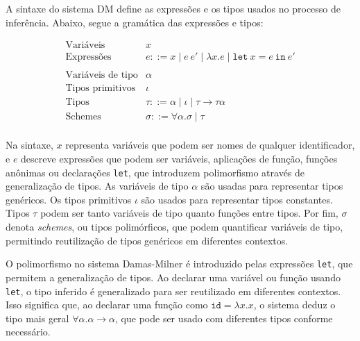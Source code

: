 A sintaxe do sistema DM define as expressões e os tipos usados no processo de inferência.
Abaixo, segue a gramática das expressões e tipos:

\begin{equation}\label{eq:dm-syntax}
  \begin{array}{ll}
    \text{Variáveis}         & x                                                                                 \\
    \text{Expressões}        & e ::= x \mid e \ e' \mid \lambda x.e \mid \texttt{let} \ x = e \ \texttt{in} \ e' \\
    \\
    \text{Variáveis de tipo} & \alpha                                                                            \\
    \text{Tipos primitivos}  & \iota                                                                             \\
    \text{Tipos}             & \tau ::= \alpha \mid \iota \mid \tau \rightarrow \tau
    \alpha                                                                                                       \\
    \text{Schemes}           & \sigma ::= \forall \alpha. \sigma \mid \tau                                       \\
  \end{array}
\end{equation}

Na sintaxe, $x$ representa variáveis que podem ser nomes de qualquer identificador, e $e$ descreve expressões que podem ser variáveis, aplicações de função, funções anônimas ou declarações \texttt{let}, que introduzem polimorfismo através de generalização de tipos.
As variáveis de tipo $\alpha$ são usadas para representar tipos genéricos.
Os tipos primitivos $\iota$ são usados para representar tipos constantes.
Tipos $\tau$ podem ser tanto variáveis de tipo quanto funções entre tipos.
Por fim, $\sigma$ denota \textit{schemes}, ou tipos polimórficos, que podem quantificar variáveis de tipo, permitindo reutilização de tipos genéricos em diferentes contextos.

O polimorfismo no sistema Damas-Milner é introduzido pelas expressões \texttt{let}, que permitem a generalização de tipos. Ao declarar uma variável ou função usando \texttt{let}, o tipo inferido é generalizado para ser reutilizado em diferentes contextos. Isso significa que, ao declarar uma função como $\texttt{id} = \lambda x.x$, o sistema deduz o tipo mais geral $\forall \alpha. \alpha \rightarrow \alpha$, que pode ser usado com diferentes tipos conforme necessário.

